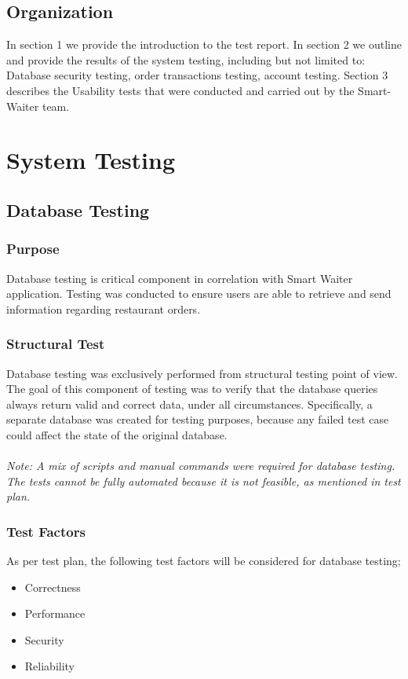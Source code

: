 \documentclass[12pt, titlepage]{article}
\begin{document}
\subsection{Organization}
In section 1 we provide the introduction to the test report. In section 2 we outline and provide the results of the system testing, including but not limited to: Database security testing, order transactions testing, account testing. Section 3 describes the Usability tests that were conducted and carried out by the Smart-Waiter team.
 
\section{System Testing} 


\subsection{Database Testing}

\subsubsection{Purpose}
Database testing is critical component in correlation with Smart Waiter application. Testing was conducted to ensure users are able to retrieve and send information regarding restaurant orders.

\subsubsection{Structural Test}
Database testing was exclusively performed from structural testing point of view. The goal of this component of testing was to verify that the database queries always return valid and correct data, under all circumstances. Specifically, a separate database was created for testing purposes, because any failed test case could affect the state of the original database.\\\\
\emph{Note: A mix of scripts and manual commands were required for database testing. The tests cannot be fully automated because it is not feasible, as mentioned in test plan.}
\subsubsection{Test Factors}
As per test plan, the following test factors will be considered for database testing;
\begin{itemize}
 \item Correctness
 \item Performance
 \item Security
 \item Reliability
 \end{itemize}
\end{document}
